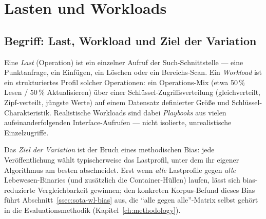 \section{Lasten und Workloads}\label{sec:workloads-basics}
\subsection{Begriff: Last, Workload und Ziel der Variation}\label{ssec:load-terms}
Eine \emph{Last} (Operation) ist ein einzelner Aufruf der Such-Schnittstelle --- eine Punktanfrage,
ein Einfügen, ein Löschen oder ein Bereichs-Scan. Ein \emph{Workload} ist ein strukturiertes Profil
solcher Operationen: ein Operations-Mix (etwa 50\,\% Lesen / 50\,\% Aktualisieren) über einer
Schlüssel-Zugriffsverteilung (gleichverteilt, Zipf-verteilt, jüngste Werte) auf einem Datensatz
definierter Größe und Schlüssel-Charakteristik. Realistische Workloads sind dabei \emph{Playbooks}
aus vielen aufeinanderfolgenden Interface-Aufrufen --- nicht isolierte, unrealistische
Einzelzugriffe.

Das \emph{Ziel der Variation} ist der Bruch eines methodischen Bias: jede Veröffentlichung wählt
typischerweise das Lastprofil, unter dem ihr eigener Algorithmus am besten abschneidet. Erst wenn
\emph{alle} Lastprofile gegen \emph{alle} Lebewesen-Binaries (und zusätzlich die Container-Hüllen)
laufen, lässt sich bias-reduzierte Vergleichbarkeit gewinnen; den konkreten Korpus-Befund dieses
Bias führt Abschnitt~\ref{ssec:sota-wl-bias} aus, die \enquote{alle gegen alle}-Matrix selbst gehört
in die Evaluationsmethodik (Kapitel~\ref{ch:methodology}).

